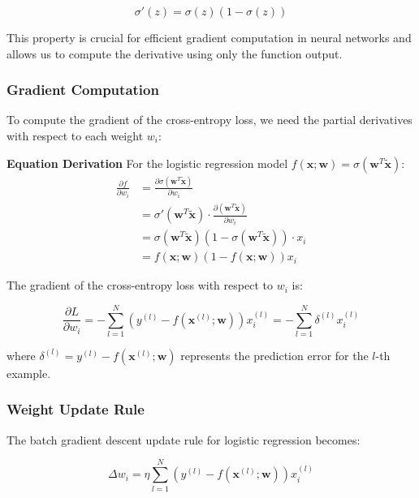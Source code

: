 \documentclass[twoside]{article}
\newcommand{\derivation}[1]{\begin{derivationbox} \textbf{Equation Derivation} \newline #1 \end{derivationbox}}
\numberwithin{equation}{section}
\begin{document}
	\begin{equation}
	\label{eq:SigmoidDerivative}
		\boxed{\sigma'(z) = \sigma(z)(1 - \sigma(z))}
	\end{equation}

	This property is crucial for efficient gradient computation in neural networks and allows us to compute the derivative using only the function output.

	\subsubsection{Gradient Computation}
	\label{subsubsec:GradientComputation}
	To compute the gradient of the cross-entropy loss, we need the partial derivatives with respect to each weight $w_i$:

	\derivation{
		For the logistic regression model $f(\mathbf{x}; \mathbf{w}) = \sigma(\mathbf{w}^T \tilde{\mathbf{x}})$:
		\begin{align}
			\frac{\partial f}{\partial w_i} &= \frac{\partial \sigma(\mathbf{w}^T \tilde{\mathbf{x}})}{\partial w_i} \\
			&= \sigma'(\mathbf{w}^T \tilde{\mathbf{x}}) \cdot \frac{\partial (\mathbf{w}^T \tilde{\mathbf{x}})}{\partial w_i} \\
			&= \sigma(\mathbf{w}^T \tilde{\mathbf{x}})(1 - \sigma(\mathbf{w}^T \tilde{\mathbf{x}})) \cdot x_i \\
			&= f(\mathbf{x}; \mathbf{w})(1 - f(\mathbf{x}; \mathbf{w})) x_i
		\end{align}
	}

	The gradient of the cross-entropy loss with respect to $w_i$ is:

	\begin{equation}
	\label{eq:CrossEntropyGradient}
		\boxed{\frac{\partial L}{\partial w_i} = -\sum_{l=1}^{N} \left( y^{(l)} - f(\mathbf{x}^{(l)}; \mathbf{w}) \right) x_i^{(l)} = -\sum_{l=1}^{N} \delta^{(l)} x_i^{(l)}}
	\end{equation}

	where $\delta^{(l)} = y^{(l)} - f(\mathbf{x}^{(l)}; \mathbf{w})$ represents the prediction error for the $l$-th example.

	\subsubsection{Weight Update Rule}
	\label{subsubsec:WeightUpdateRule}
	The batch gradient descent update rule for logistic regression becomes:

	\begin{equation}
	\label{eq:WeightUpdate}
		\boxed{\Delta w_i = \eta \sum_{l=1}^{N} \left( y^{(l)} - f(\mathbf{x}^{(l)}; \mathbf{w}) \right) x_i^{(l)}}
	\end{equation}
\end{document}
